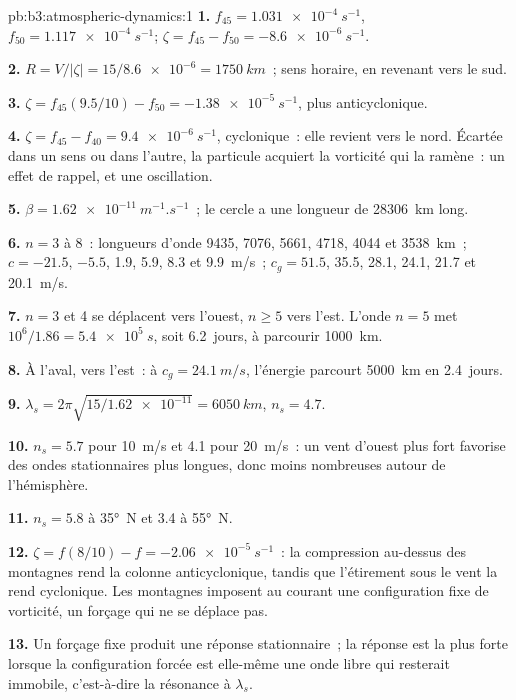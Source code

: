 \begin{solution}{pb:b3:atmospheric-dynamics:1}
\textbf{1.} $f_{45} = \qty{1.031e-4}{s^{-1}}$, $f_{50} =
\qty{1.117e-4}{s^{-1}}$; $\zeta = f_{45} - f_{50} = \qty{-8.6e-6}{s^{-1}}$.

\textbf{2.} $R = V/|\zeta| = 15/\num{8.6e-6} = \qty{1750}{km}$~; sens horaire,
en revenant vers le sud.

\textbf{3.} $\zeta = f_{45}(9.5/10) - f_{50} = \qty{-1.38e-5}{s^{-1}}$, plus
anticyclonique.

\textbf{4.} $\zeta = f_{45} - f_{40} = \qty{+9.4e-6}{s^{-1}}$, cyclonique~: elle
revient vers le nord. Écartée dans un sens ou dans l'autre, la particule acquiert la vorticité
qui la ramène~: un effet de rappel, et une oscillation.

\textbf{5.} $\beta = \qty{1.62e-11}{m^{-1}.s^{-1}}$~; le cercle a une longueur de
\qty{28306}{km} long.

\textbf{6.} $n = 3$ à 8~: longueurs d'onde 9435, 7076, 5661, 4718, 4044 et
\qty{3538}{km}~; $c = -21.5$, $-5.5$, 1.9, 5.9, 8.3 et \qty{9.9}{m/s}~; $c_g
= 51.5$, 35.5, 28.1, 24.1, 21.7 et \qty{20.1}{m/s}.

\textbf{7.} $n = 3$ et 4 se déplacent vers l'ouest, $n \ge 5$ vers l'est. L'onde $n = 5$ met
$10^6/1.86 = \qty{5.4e5}{s}$, soit \num{6.2}~jours, à parcourir \qty{1000}{km}.

\textbf{8.} À l'aval, vers l'est~: à $c_g = \qty{24.1}{m/s}$, l'énergie parcourt
\qty{5000}{km} en \num{2.4}~jours.

\textbf{9.} $\lambda_s = 2\pi\sqrt{15/\num{1.62e-11}} = \qty{6050}{km}$,
$n_s = 4.7$.

\textbf{10.} $n_s = 5.7$ pour \qty{10}{m/s} et 4.1 pour \qty{20}{m/s}~: un
vent d'ouest plus fort favorise des ondes stationnaires plus longues, donc
moins nombreuses autour de l'hémisphère.

\textbf{11.} $n_s = 5.8$ à \ang{35}~N et 3.4 à \ang{55}~N.

\textbf{12.} $\zeta = f(8/10) - f = \qty{-2.06e-5}{s^{-1}}$~: la compression
au-dessus des montagnes rend la colonne anticyclonique, tandis que
l'étirement sous le vent la rend cyclonique. Les montagnes imposent au
courant une configuration fixe de vorticité, un forçage qui ne se déplace pas.

\textbf{13.} Un forçage fixe produit une réponse stationnaire~; la réponse est
la plus forte lorsque la configuration forcée est elle-même une onde libre
qui resterait immobile, c'est-à-dire la résonance à $\lambda_s$.


\end{solution}

